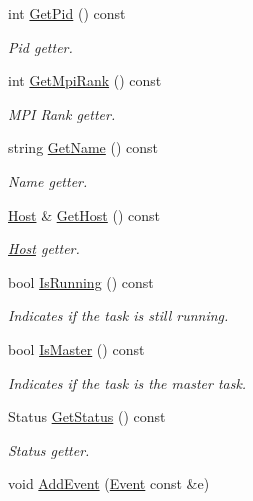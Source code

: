 \begin{DoxyCompactItemize}
\item 
int \hyperlink{class_model_1_1_task_a8010c7e23d76c3738d3b747c90ef07da}{Get\-Pid} () const 
\begin{DoxyCompactList}\small\item\em Pid getter. \end{DoxyCompactList}\item 
int \hyperlink{class_model_1_1_task_aa41c18d9000230367ade253dbf502e0b}{Get\-Mpi\-Rank} () const 
\begin{DoxyCompactList}\small\item\em M\-P\-I Rank getter. \end{DoxyCompactList}\item 
string \hyperlink{class_model_1_1_task_a185e564c04782f27d2f84e91b1d09304}{Get\-Name} () const 
\begin{DoxyCompactList}\small\item\em Name getter. \end{DoxyCompactList}\item 
\hyperlink{class_model_1_1_host}{Host} \& \hyperlink{class_model_1_1_task_aff61f76ad875de34e318d845b87741af}{Get\-Host} () const 
\begin{DoxyCompactList}\small\item\em \hyperlink{class_model_1_1_host}{Host} getter. \end{DoxyCompactList}\item 
bool \hyperlink{class_model_1_1_task_a1bdf559ebb230680f6d2d347c15b6617}{Is\-Running} () const 
\begin{DoxyCompactList}\small\item\em Indicates if the task is still running. \end{DoxyCompactList}\item 
bool \hyperlink{class_model_1_1_task_affaa9bbd393f322bbfea25dcc775345c}{Is\-Master} () const 
\begin{DoxyCompactList}\small\item\em Indicates if the task is the master task. \end{DoxyCompactList}\item 
Status \hyperlink{class_model_1_1_task_a9778f54fef67722f1f785608e0aff0c5}{Get\-Status} () const 
\begin{DoxyCompactList}\small\item\em Status getter. \end{DoxyCompactList}\item 
void \hyperlink{class_model_1_1_task_a4f4799f377c36a6790b4984fdae85351}{Add\-Event} (\hyperlink{class_model_1_1_event}{Event} const \&e)

\end{DoxyCompactItemize}
